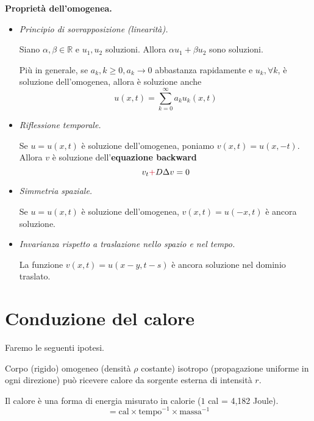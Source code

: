 \textbf{Proprietà dell'omogenea.}
\begin{itemize}
    \item \emph{Principio di sovrapposizione (linearità).}

          Siano $\alpha,\beta \in \mathbb{R}$ e $u_{1},u_{2}$ soluzioni. Allora $\alpha u_{1} +\beta u_{2}$ sono soluzioni.

          Più in generale, se $a_{k},k\geq 0,a_{k}\rightarrow 0$ abbastanza rapidamente e $u_{k},\forall k$, è soluzione dell'omogenea, allora è soluzione anche
          \begin{equation*}
              u(x,t) = \sum\limits ^{\infty }_{k=0} a_{k} u_{k}(x,t)
          \end{equation*}

    \item \emph{Riflessione temporale.}

          Se $u=u(x,t)$ è soluzione dell'omogenea, poniamo $v(x,t) =u(x,-t)$. Allora $v$ è soluzione dell'\textbf{equazione backward}
          \begin{equation*}
              v_{t}\textcolor[rgb]{0.82,0.01,0.11}{+} D\Delta v=0
          \end{equation*}
    \item \emph{Simmetria spaziale.}

          Se $u=u(x,t)$ è soluzione dell'omogenea, $v(x,t) =u(-x,t)$ è ancora soluzione.

    \item \emph{Invarianza rispetto a traslazione nello spazio e nel tempo.}

          La funzione $v(x,t) =u(x-y,t-s)$ è ancora soluzione nel dominio traslato.
\end{itemize}

\section{Conduzione del calore}
Faremo le seguenti ipotesi.

Corpo (rigido) omogeneo (densità $\rho $ costante) isotropo (propagazione uniforme in ogni direzione) può ricevere calore da sorgente esterna di intensità $r$.

Il calore è una forma di energia misurato in calorie ($1$ cal = 4,182 Joule).
\begin{equation*}
    [r] =\text{cal} \times \text{tempo}^{-1} \times \text{massa}^{-1}
\end{equation*}

